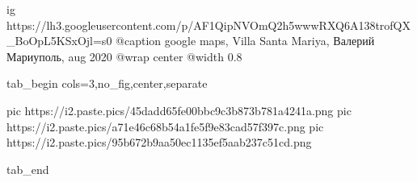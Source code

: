  
 
 
 
 

\begin{center}
\begin{minipage}{\textwidth}
\ifcmt
  ig https://lh3.googleusercontent.com/p/AF1QipNVOmQ2h5wwwRXQ6A138trofQX_BoOpL5KSxOjl=s0
	@caption google maps, Villa Santa Mariya, Валерий Мариуполь, aug 2020
  @wrap center
  @width 0.8
\fi

\ifcmt
  tab_begin cols=3,no_fig,center,separate

     pic https://i2.paste.pics/45dadd65fe00bbc9c3b873b781a4241a.png
		 pic https://i2.paste.pics/a71e46c68b54a1fe5f9e83cad57f397c.png
		 pic https://i2.paste.pics/95b672b9aa50ec1135ef5aab237c51cd.png

  tab_end
\fi
\end{minipage}
\end{center}
